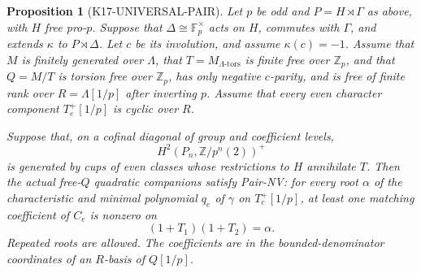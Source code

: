 \documentclass[11pt,a4paper]{article}
\newtheorem{proposition}[theorem]{Proposition}
\theoremstyle{definition}
\begin{document}
\begin{proposition}[K17-UNIVERSAL-PAIR]\label{prop:universal-pair}
Let \(p\) be odd and \(P=H\rtimes\Gamma\) as above, with \(H\)
free pro-\(p\).  Suppose that
\(\Delta\cong\mathbb F_p^\times\) acts on \(H\), commutes with
\(\Gamma\), and extends \(\kappa\) to \(P\rtimes\Delta\).
Let \(c\) be its involution, and assume \(\kappa(c)=-1\).
Assume that \(M\) is finitely generated over \(\Lambda\), that
\(T=M_{\Lambda\text{-tors}}\) is finite free over \(\mathbb Z_p\),
and that \(Q=M/T\) is torsion free over \(\mathbb Z_p\), has only
negative \(c\)-parity, and is free of finite rank over
\(R=\Lambda[1/p]\) after inverting \(p\).
Assume that every even character component \(T_e^+[1/p]\) is
cyclic over \(R\).

Suppose that, on a cofinal diagonal of group and coefficient
levels,
\[
 H^2(P_n,\mathbb Z/p^n(2))^+
\]
is generated by cups of even classes whose restrictions to \(H\)
annihilate \(T\).  Then the actual free-\(Q\) quadratic companions
satisfy Pair-NV: for every root \(\alpha\) of the characteristic
and minimal polynomial \(q_e\) of \(\gamma\) on
\(T_e^+[1/p]\), at least one matching coefficient of \(C_e\) is
nonzero on
\[
                     (1+T_1)(1+T_2)=\alpha.                \tag{NC.7}
\]
Repeated roots are allowed.  The coefficients are in the
bounded-denominator coordinates of an \(R\)-basis of \(Q[1/p]\).
\end{proposition}
\end{document}
